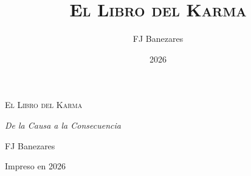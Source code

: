 \documentclass[12pt,paper=6in:9in,pagesize=pdftex,oneside,openany]{book}
\title{\Huge\scshape El Libro del Karma}
\author{\Large FJ Banezares}
\date{2026}
\begin{document}
\frontmatter
\begin{titlepage}
    \centering
    \vspace*{2cm}
    {\Huge\scshape\color{gold} El Libro del Karma \par}
    \vspace{1cm}
    {\Large\itshape De la Causa a la Consecuencia \par}
    \vspace{4cm}
    {\Large FJ Banezares \par}
    \vfill
    {\small Impreso en 2026 \par}
\end{titlepage}

\clearpage
\tableofcontents

\mainmatter
























\end{document}

